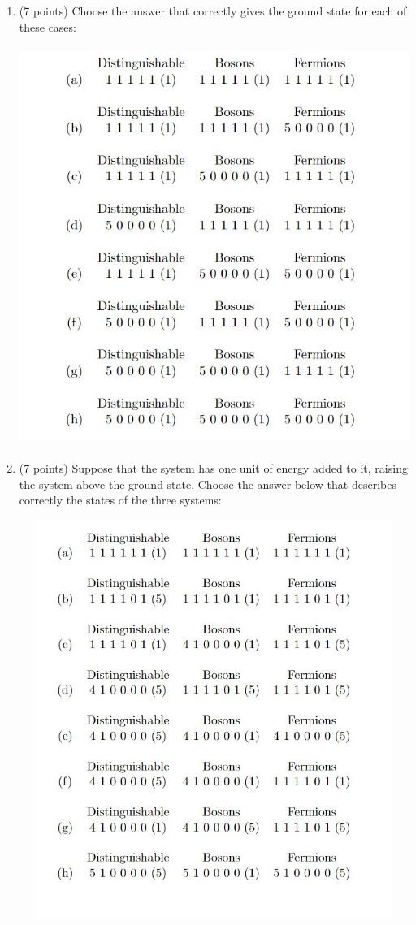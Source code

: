 \documentclass[fleqn]{article}
\begin{document}
  \begin{enumerate}
    \item (7 points) Choose the answer that correctly gives the ground state for each of these cases:
    \begin{center}
      \includegraphics[height=13cm, width=16cm]{1.JPG}
    \end{center}

    \pagebreak

    \item (7 points) Suppose that the system has one unit of energy added to it, raising the system above
    the ground state. Choose the answer below that describes correctly the states of the three
    systems:
    \begin{center}
      \includegraphics[height=13cm, width=16cm]{2.JPG}
    \end{center}


\end{enumerate}
\end{document}
